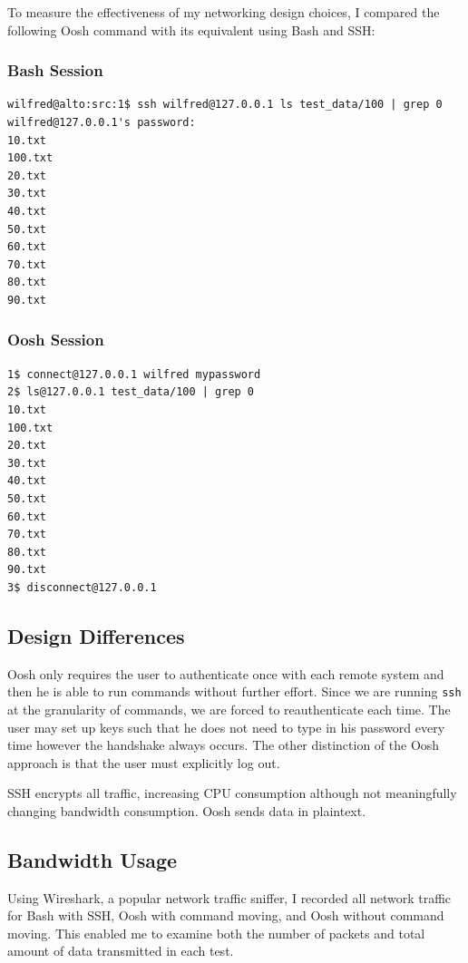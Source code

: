 \documentclass[12pt,twoside,notitlepage]{report}
\begin{document}
To measure the effectiveness of my networking design choices, I
compared the following Oosh command with its equivalent using Bash and
SSH:

\subsubsection{Bash Session}
\begin{verbatim}
wilfred@alto:src:1$ ssh wilfred@127.0.0.1 ls test_data/100 | grep 0
wilfred@127.0.0.1's password:
10.txt
100.txt
20.txt
30.txt
40.txt
50.txt
60.txt
70.txt
80.txt
90.txt
\end{verbatim}

\subsubsection{Oosh Session}
\begin{verbatim}
1$ connect@127.0.0.1 wilfred mypassword
2$ ls@127.0.0.1 test_data/100 | grep 0
10.txt
100.txt
20.txt
30.txt
40.txt
50.txt
60.txt
70.txt
80.txt
90.txt
3$ disconnect@127.0.0.1
\end{verbatim}

\subsection{Design Differences}
Oosh only requires the user to authenticate once with each remote
system and then he is able to run commands without further
effort. Since we are running {\tt ssh} at the granularity of commands,
we are forced to reauthenticate each time. The user may set up keys
such that he does not need to type in his password every time however
the handshake always occurs. The other distinction of the Oosh
approach is that the user must explicitly log out.

SSH encrypts all traffic, increasing CPU consumption although not
meaningfully changing bandwidth consumption. Oosh sends data in
plaintext.

\subsection{Bandwidth Usage}
Using Wireshark, a popular network traffic sniffer, I recorded all
network traffic for Bash with SSH, Oosh with command moving, and Oosh
without command moving. This enabled me to examine both the number of
packets and total amount of data transmitted in each test.
\end{document}
